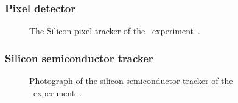 \FloatBarrier
\subsubsection{Pixel detector} 

\begin{figure}[ht]
  \caption{
    The Silicon pixel tracker of the \atlas\ experiment~\cite{Pequenao:1095925}.
  }
  \label{fig:pixel_cartoon}
\end{figure}


\FloatBarrier
\subsubsection{Silicon semiconductor tracker} 

\begin{figure}[ht]
  \caption{
    Photograph of the silicon semiconductor tracker of the
    \atlas\ experiment~\cite{Maximilien:883305}.
  }
  \label{fig:sct_photo}
\end{figure}


